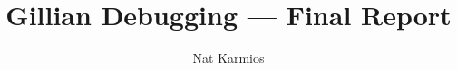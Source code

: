 \documentclass[a4paper, twoside]{report}
\title{Gillian Debugging --- Final Report}
\author{Nat Karmios}
\begin{document}
\def\chapterautorefname{\normalcolor{Chapter}\color{blue}}
\def\sectionautorefname{\normalcolor{\S}\kern-0.7ex\color{blue}}
\def\subsectionautorefname{\normalcolor{\S}\kern-0.7ex\color{blue}}
\def\figureautorefname{\normalcolor{Figure}\color{blue}}
\def\lstnumberautorefname{\normalcolor{line}\color{blue}}



\listoftodos{}
\tableofcontents









\end{document}
